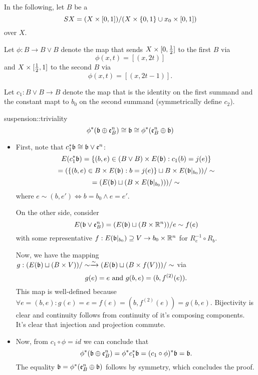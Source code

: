 \begin{myparagraph}
    In the following, let $B$ be a 
    \[ SX = (X \times [0, 1]) / (X \times \{ 0, 1 \} \cup x_0 \times [0, 1])\]
    over $X$.

    Let $\phi: B \to B \vee B$ denote the map that sends
    $X \times [0, \frac{1}{2}]$ to the first $B$ via
    \[ \phi(x, t) = [(x, 2t)] \]
    and $X \times [\frac{1}{2}, 1]$ to the second $B$ via
    \[ \phi(x, t) = [(x, 2t - 1)]. \]

    Let $c_1: B \vee B \to B$ denote the map that is the identity on the first summand
    and the constant mapt to $b_0$ on the second summand (symmetrically define $c_2$).
\end{myparagraph}

\begin{mylemma}{suspension::triviality}
    \[ \phi^*(\mathfrak{b} \oplus \mathfrak{e}^{n}_B) \cong \mathfrak{b} \cong \phi^*(\mathfrak{e}^{n}_B \oplus \mathfrak{b}) \]
\end{mylemma}
\begin{myproof}
    \begin{itemize}
        \item First, note that $c_1^*\mathfrak{b} \cong \mathfrak{b} \vee \mathfrak{e}^{n}$:
        \[ E(c_1^*\mathfrak{b}) = \{(b, e) \in (B \vee B) \times E(\mathfrak{b}):c_1(b) = j(e)\} \]
        \[ = (\{(b, e) \in B \times E(\mathfrak{b}):b = j(e)\} \sqcup B \times E(\mathfrak{b}\vert_{b_0})) / \sim \]
        \[ = (E(\mathfrak{b}) \sqcup (B \times E(\mathfrak{b}\vert_{b_0}))) / \sim\]
        where $e \sim (b, e') \iff b = b_0 \land e = e'$.
        
        On the other side, consider
        \[ E(\mathfrak{b} \vee \mathfrak{e}^{n}_B) = (E(\mathfrak{b}) \sqcup (B \times \mathbb{R}^n)) / e \sim f(e) \]
        with some representative $f: E(\mathfrak{b}\vert_{b_0}) \supseteq{} V \to b_0 \times \mathbb{R}^n$ for $R_e^{-1} \circ R_b$.
        
        Now, we have the mapping $g: (E(\mathfrak{b}) \sqcup (B \times V)) / \sim \xrightarrow{\sim} (E(\mathfrak{b}) \sqcup (B \times f(V))) / \sim$ via
        \[ g(e) = e \text{ and } g(b, e) = (b, f^{(2)}(e)). \]
        This map is well-defined because $\forall e = (b, e): g(e) = e = f(e) = (b, f^{(2)}(e)) = g(b, e)$.
        Bijectivity is clear and continuity follows from continuity of it's composing components.
        It's clear that injection and projection commute.
        \item Now, from $c_1 \circ \phi = id$ we can conclude that
        \[ \phi^*(\mathfrak{b} \oplus \mathfrak{e}^{n}_B) = \phi^*c_1^*\mathfrak{b} = (c_1 \circ \phi)^*\mathfrak{b} = \mathfrak{b}. \]
        The equality $\mathfrak{b} = \phi^*(\mathfrak{e}^{n}_B \oplus \mathfrak{b})$ follows by symmetry, which concludes the proof.
    \end{itemize}
\end{myproof}

